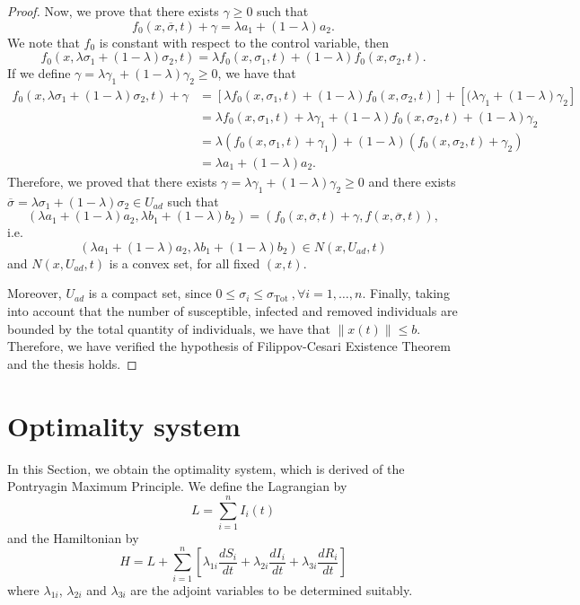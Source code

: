 \documentclass[a4paper,10pt]{article}
\theoremstyle{remark}
\begin{document}
\begin{proof}
Now, we prove that there exists $\gamma \geq 0$ such that
$$f_{0}\left(x, \overline{\sigma}, t\right)+\gamma=\lambda a_{1}+(1-\lambda) a_{2}.$$
We note that $f_0$ is constant with respect to the control variable, then
$$
f_{0}\left(x, \lambda \sigma_{1}+(1-\lambda) \sigma_{2}, t\right)=\lambda f_{0}\left(x, \sigma_{1}, t\right)+(1-\lambda) f_{0}\left(x, \sigma_{2}, t\right).
$$
If we define $\gamma=\lambda \gamma_{1}+(1-\lambda) \gamma_{2} \geq 0$, we have that
$$
\begin{aligned}
f_{0}\left(x,\lambda \sigma_{1}+(1-\lambda) \sigma_{2}, t\right)+\gamma &=\left[\lambda f_{0}\left(x,\sigma_{1}, t\right)+(1-\lambda) f_{0}\left(x, \sigma_{2}, t\right)\right]+\left[(\lambda \gamma_{1}+(1-\lambda) \gamma_{2}\right] \\
&=\lambda f_{0}\left(x,\sigma_{1}, t\right)+\lambda \gamma_{1}+(1-\lambda) f_{0}\left(x, \sigma_{2}, t\right)+(1-\lambda) \gamma_{2} \\
&=\lambda\left(f_{0}\left(x, \sigma_{1}, t\right)+\gamma_{1}\right)+(1-\lambda)\left(f_{0}\left(x, \sigma_{2}, t\right)+\gamma_{2}\right) \\
&=\lambda a_{1}+(1-\lambda) a_{2}.
\end{aligned}
$$
Therefore, we proved that there exists 
$\gamma=\lambda \gamma_{1}+(1-\lambda) \gamma_{2} \geq 0$ and there exists $\overline{\sigma}=\lambda \sigma_{1}+(1-\lambda) \sigma_{2} \in U_{ad}$
such that 
$$\left(\lambda {a_{1}}+(1-\lambda) {a_{2}}, \lambda b_{1}+(1-\lambda) b_{2}\right)=\left(f_{0}\left(x, \overline{\sigma}, t\right)+\gamma , f\left(x, \overline{\sigma}, t\right)\right),$$
i.e.
$$\left(\lambda a_{1}+(1-\lambda) a_{2}, \lambda b_{1}+(1-\lambda) b_{2}\right) \in N\left(x, U_{ad}, t\right)$$
and $N\left(x, U_{a d}, t\right)$ is a convex set, for all fixed $(x,t)$.

Moreover, $U_{ad}$ is a compact set, since $0 \leq \sigma_{i} \leq \sigma_{\text {Tot }}, \forall i=1, \ldots, n$. Finally, taking into account that the number of susceptible, infected and removed individuals are bounded by the total quantity of individuals, we have that $\|x(t)\| \leqslant b$. Therefore, we have verified the hypothesis of Filippov-Cesari Existence Theorem and the thesis holds.
\end{proof}

\section{Optimality system}

In this Section, we obtain the optimality system, which is derived of the Pontryagin Maximum Principle. We define the Lagrangian by
\[
L=\sum_{i=1}^{n} I_{i}(t)
\]
and the Hamiltonian by
\[
H=L+\sum_{i=1}^{n} \left[\lambda_{1i}\frac{d S_{i}}{dt}+\lambda_{2i}\frac{d I_{i}}{dt}+\lambda_{3i}\frac{d R_{i}}{dt}\right] 
\]
where $\lambda_{1i}$, $\lambda_{2i}$ and $\lambda_{3i}$ are the adjoint variables to be determined suitably.
\end{document}
